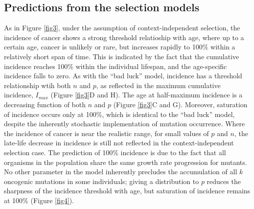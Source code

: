 \documentclass[10pt,twocolumn,twoside]{article}
\begin{document}
\subsection{Predictions from the selection models}
As in Figure \ref{fig3}, under the assumption of context-independent selection, the incidence of cancer shows a strong threshold relatioship with age, where up to a certain age, cancer is unlikely or rare, but increases rapidly to 100\% within a relatively short span of time. This is indicated by the fact that the cumulative incidence reaches 100\% within the individual lifespan, and the age-specific incidence falls to zero. As with the ``bad luck'' model, incidence has a threshold relationship wtih both $n$ and $p$, as reflected in the maximum cumulative incidence, $I_{max}$ (Figure \ref{fig3}D and H). The age at half-maximum incidence is a decreasing function of both $n$ and $p$ (Figure \ref{fig3}C and G). Moreover, saturation of incidence occurs only at 100\%, which is identical to the ``bad luck'' model, despite the inherently stochastic implementation of mutation occurrence. Where the incidence of cancer is near the realistic range, for small values of $p$ and $n$, the late-life decrease in incidence is still not reflected in the context-independent selection case. The prediction of 100\% incidence is due to the fact that all organisms in the population share the same growth rate progression for mutants. No other parameter in the model inherently precludes the accumulation of all $k$ oncogenic mutations in some individuals; giving a distribution to $p$ reduces the sharpness of the incidence threshold with age, but saturation of incidence remains at 100\% (Figure \ref{fig4}). 
\end{document}
